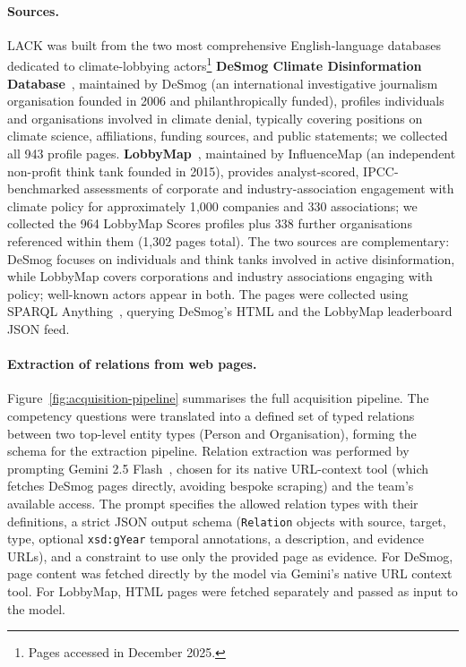 \paragraph{Sources.}
LACK was built from the two most comprehensive English-language databases dedicated to climate-lobbying actors\footnote{Pages accessed in December 2025.} %
\textbf{DeSmog Climate Disinformation Database}~\cite{desmog}, maintained by DeSmog (an international investigative journalism organisation founded in 2006 and philanthropically funded), profiles individuals and organisations involved in climate denial, typically covering positions on climate science, affiliations, funding sources, and public statements; we collected all 943 profile pages.
\textbf{LobbyMap}~\cite{lobbymap}, maintained by InfluenceMap (an independent non-profit think tank founded in 2015), provides analyst-scored, IPCC-benchmarked assessments of corporate and industry-association engagement with climate policy for approximately 1{,}000 companies and 330 associations; we collected the 964 LobbyMap Scores profiles plus 338 further organisations referenced within them (1,302 pages total).
The two sources are complementary: DeSmog focuses on individuals and think tanks involved in active disinformation, while LobbyMap covers corporations and industry associations engaging with policy; well-known actors appear in both.
The pages were collected using SPARQL Anything~\cite{daga2021opinionated}, querying DeSmog's HTML and the LobbyMap leaderboard JSON feed.

\paragraph{Extraction of relations from web pages.}
Figure~\ref{fig:acquisition-pipeline} summarises the full acquisition pipeline.
The competency questions were translated into a defined set of typed relations between two top-level entity types (Person and Organisation), forming the schema for the extraction pipeline.
Relation extraction was performed by prompting Gemini 2.5 Flash~\cite{gemini25}, chosen for its native URL-context tool (which fetches DeSmog pages directly, avoiding bespoke scraping) and the team's available access.
The prompt specifies the allowed relation types with their definitions, a strict JSON output schema (\texttt{Relation} objects with source, target, type, optional \texttt{xsd:gYear} temporal annotations, a description, and evidence URLs), and a constraint to use only the provided page as evidence.
For DeSmog, page content was fetched directly by the model via Gemini's native URL context tool.
For LobbyMap, HTML pages were fetched separately and passed as input to the model.

